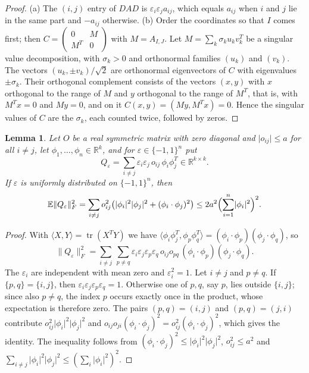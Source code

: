 \documentclass[11pt]{amsart}
\numberwithin{equation}{section}
\newtheorem{lemma}[theorem]{Lemma}
\theoremstyle{definition}
\theoremstyle{remark}
\newcommand{\R}{\mathbb R}
\newcommand{\E}{\mathbb E}
\newcommand{\1}{\mathbf 1}
\DeclareMathOperator{\tr}{tr}
\newcommand{\norm}[1]{\lVert #1\rVert}
\newcommand{\abs}[1]{\lvert #1\rvert}
\begin{document}
\begin{proof}
(a) The $(i,j)$ entry of $DAD$ is $\varepsilon_i\varepsilon_ja_{ij}$, which equals $a_{ij}$ when $i$ and $j$ lie in the same part and $-a_{ij}$ otherwise. (b) Order the coordinates so that $I$ comes first; then $C=\begin{pmatrix}0&M\\M^T&0\end{pmatrix}$ with $M=A_{I,J}$. Let $M=\sum_k\sigma_ku_kv_k^T$ be a singular value decomposition, with $\sigma_k>0$ and orthonormal families $(u_k)$ and $(v_k)$. The vectors $(u_k,\pm v_k)/\sqrt2$ are orthonormal eigenvectors of $C$ with eigenvalues $\pm\sigma_k$. Their orthogonal complement consists of the vectors $(x,y)$ with $x$ orthogonal to the range of $M$ and $y$ orthogonal to the range of $M^T$, that is, with $M^Tx=0$ and $My=0$, and on it $C(x,y)=(My,M^Tx)=0$. Hence the singular values of $C$ are the $\sigma_k$, each counted twice, followed by zeros.
\end{proof}

\begin{lemma}\label{lem:signs}
Let $O$ be a real symmetric matrix with zero diagonal and $\abs{o_{ij}}\le a$ for all $i\ne j$, let $\phi_1,\dots,\phi_n\in\R^k$, and for $\varepsilon\in\{-1,1\}^n$ put
\[
Q_\varepsilon=\sum_{i\ne j}\varepsilon_i\varepsilon_j\,o_{ij}\,\phi_i\phi_j^T\in\R^{k\times k}.
\]
If $\varepsilon$ is uniformly distributed on $\{-1,1\}^n$, then
\[
\E\norm{Q_\varepsilon}_F^2=\sum_{i\ne j}o_{ij}^2\bigl(\abs{\phi_i}^2\abs{\phi_j}^2+(\phi_i\cdot\phi_j)^2\bigr)\le2a^2\Bigl(\sum_{i=1}^n\abs{\phi_i}^2\Bigr)^2 .
\]
\end{lemma}

\begin{proof}
With $\langle X,Y\rangle=\tr(X^TY)$ we have $\langle\phi_i\phi_j^T,\phi_p\phi_q^T\rangle=(\phi_i\cdot\phi_p)(\phi_j\cdot\phi_q)$, so
\[
\norm{Q_\varepsilon}_F^2=\sum_{i\ne j}\ \sum_{p\ne q}\varepsilon_i\varepsilon_j\varepsilon_p\varepsilon_q\,o_{ij}o_{pq}\,(\phi_i\cdot\phi_p)(\phi_j\cdot\phi_q).
\]
The $\varepsilon_i$ are independent with mean zero and $\varepsilon_i^2=1$. Let $i\ne j$ and $p\ne q$. If $\{p,q\}=\{i,j\}$, then $\varepsilon_i\varepsilon_j\varepsilon_p\varepsilon_q=1$. Otherwise one of $p,q$, say $p$, lies outside $\{i,j\}$; since also $p\ne q$, the index $p$ occurs exactly once in the product, whose expectation is therefore zero. The pairs $(p,q)=(i,j)$ and $(p,q)=(j,i)$ contribute $o_{ij}^2\abs{\phi_i}^2\abs{\phi_j}^2$ and $o_{ij}o_{ji}(\phi_i\cdot\phi_j)^2=o_{ij}^2(\phi_i\cdot\phi_j)^2$, which gives the identity. The inequality follows from $(\phi_i\cdot\phi_j)^2\le\abs{\phi_i}^2\abs{\phi_j}^2$, $o_{ij}^2\le a^2$ and $\sum_{i\ne j}\abs{\phi_i}^2\abs{\phi_j}^2\le(\sum_i\abs{\phi_i}^2)^2$.
\end{proof}
\end{document}
